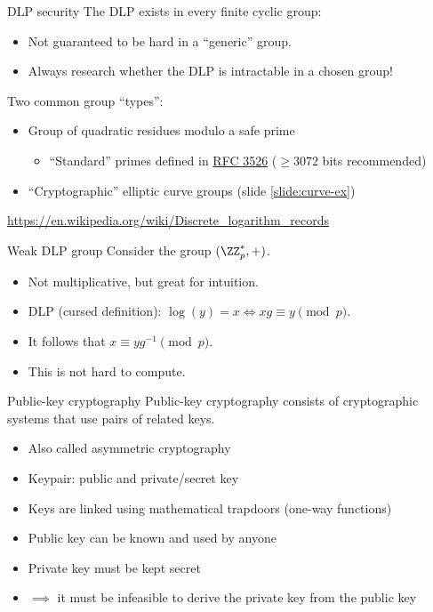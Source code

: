\begin{frame}{DLP security}
  The DLP exists in every finite cyclic group:
  \pause
  \begin{itemize}
    \item Not guaranteed to be hard in a \enquote{generic} group.
    \item Always research whether the DLP is intractable in a chosen group!
  \end{itemize}

  \vspace*{1em}

  \pause
  Two common group \enquote{types}:
  \begin{itemize}[<+(1)->]
    \item Group of quadratic residues modulo a safe prime
    \begin{itemize}
      \item \enquote{Standard} primes defined in \href{https://datatracker.ietf.org/doc/html/rfc3526}{RFC 3526} ($\ge3072$ bits recommended)
    \end{itemize}
    \item \enquote{Cryptographic} elliptic curve groups (slide \ref{slide:curve-ex})
  \end{itemize}

  \pause
  {\scriptsize\url{https://en.wikipedia.org/wiki/Discrete_logarithm_records}}
\end{frame}

\begin{frame}{Weak DLP group}
  Consider the group $(\ZZ_p^*, +)$.
  \begin{itemize}[<+(1)->]
    \item Not multiplicative, but great for intuition.
    \item DLP (cursed definition): $\log(y) = x \iff xg \equiv y \pmod{p}$.
    \item It follows that $x \equiv yg^{-1} \pmod{p}$.
    \item This is not hard to compute.
  \end{itemize}
\end{frame}

\begin{frame}{Public-key cryptography}
  Public-key cryptography consists of cryptographic systems that use pairs of related keys.
  \begin{itemize}[<+(1)->]
    \item Also called asymmetric cryptography
    \item Keypair: public and private/secret key
    \item Keys are linked using mathematical trapdoors (one-way functions)
    \item Public key can be known and used by anyone
    \item Private key must be kept secret
    \item $\implies$ it must be infeasible to derive the private key from the public key
  \end{itemize}
\end{frame}

